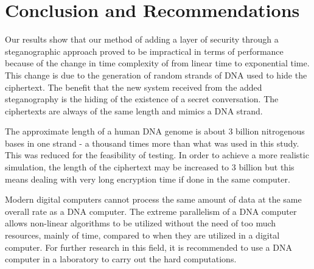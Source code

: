 \section{Conclusion and Recommendations}

Our results show that our method of adding a layer of security through a steganographic approach proved to be impractical in terms of performance because of the change in time complexity of from linear time to exponential time. This change is due to the generation of random strands of DNA used to hide the ciphertext. The benefit that the new system received from the added steganography is the hiding of the existence of a secret conversation. The ciphertexts are always of the same length and mimics a DNA strand.

The approximate length of a human DNA genome is about 3 billion nitrogenous bases in one strand - a thousand times more than what was used in this study. This was reduced for the feasibility of testing. In order to achieve a more realistic simulation, the length of the ciphertext may be increased to 3 billion but this means dealing with very long encryption time if done in the same computer.

Modern digital computers cannot process the same amount of data at the same overall rate as a DNA computer. The extreme parallelism of a DNA computer allows non-linear algorithms to be utilized without the need of too much resources, mainly of time, compared to when they are utilized in a digital computer. For further research in this field, it is recommended to use a DNA computer in a laboratory to carry out the hard computations.

{}
